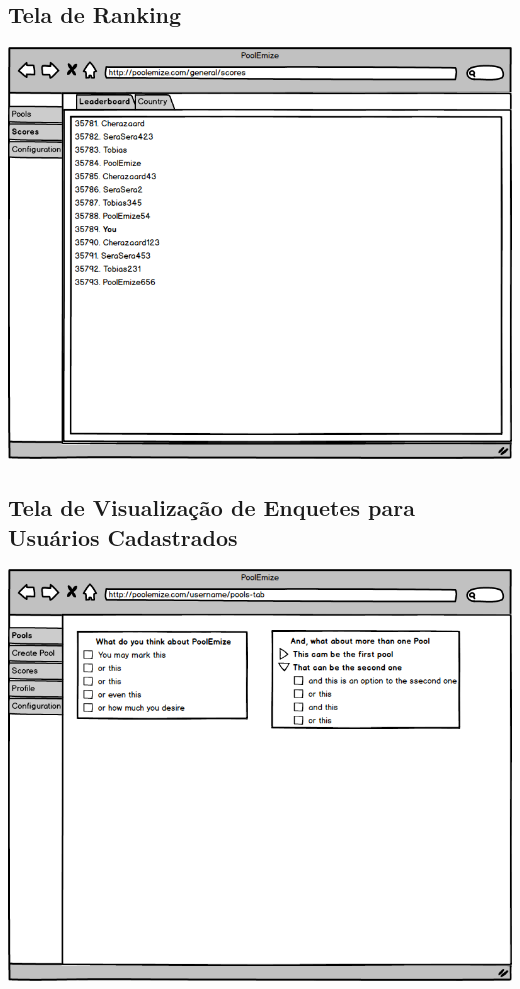 \documentclass[a4paper,12pt]{report}
\begin{document}
\subsection*{Tela de Ranking}
\markright{}
\includegraphics[width=14.3cm]{mockups/GeneralScoreScreenTab.png}
\subsection*{Tela de Visualização de Enquetes para Usuários Cadastrados}
\markright{}
\includegraphics[width=14.3cm]{mockups/PoollsTab.png}
\end{document}
